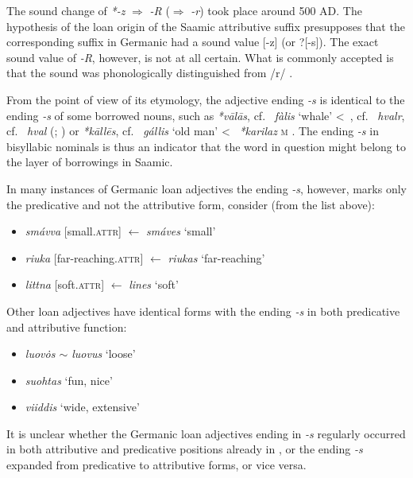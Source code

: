 {\begin{itemize}
\end{itemize}
The sound change of  \textit{*-z} $\Rightarrow$  \textit{-R} ($\Rightarrow$  \textit{-r}) took place around 500 AD. The hypothesis of the loan origin of the Saamic attributive suffix presupposes that the corresponding suffix in Germanic had a sound value [-z] (or ?[-s]). The exact sound value of \textit{-R}, however, is not at all certain. What is commonly accepted is that the sound was phonologically distinguished from /r/ \citep{skold1954}.

From the point of view of its etymology, the adjective ending \textit{-s} is identical to the ending \textit{-s} of some borrowed  nouns, such as  \textit{*vālās}, cf.~ \textit{fàlis} ‘whale’ <~, cf.~ \textit{hvalr}, cf.~ \textit{hval} (\citealt[144]{qvigstad1893}; \citealt[144–145]{lehtiranta1989}) or  \textit{*kāllēs}, cf.~ \textit{gállis} ‘old man’ <~ \textit{*karilaz} \textsc{m} \cite[44–45]{lehtiranta1989}. The ending \textit{-s} in bisyllabic nominals is thus an indicator that the word in question might belong to the layer of  borrowings in Saamic.

In many instances of Germanic loan adjectives the ending \textit{-s}, however, marks only the predicative and not the attributive form, consider (from the list above):
\begin{itemize}
\item {} \textit{smávva} [small.\textsc{attr}] $\leftarrow$ \textit{smáves} ‘small’
\item {} \textit{riuka} [far-reaching.\textsc{attr}] $\leftarrow$ \textit{riukas} ‘far-reaching’
\item {} \textit{littna} [soft.\textsc{attr}] $\leftarrow$ \textit{lines} ‘soft’
\end{itemize}
Other loan adjectives have identical forms with the ending \textit{-s} in both predicative and attributive function:
\begin{itemize}
\item {} \textit{luov\.{o}s $\sim$ luovus} ‘loose'
\item {} \textit{suohtas} ‘fun, nice'
\item {} \textit{viiddis} ‘wide, extensive'
\end {itemize}
It is unclear whether the Germanic loan adjectives ending in \textit{-s} regularly occurred in both attributive and predicative positions already in , or the ending \textit{-s} expanded from predicative to attributive forms, or vice versa.

}
